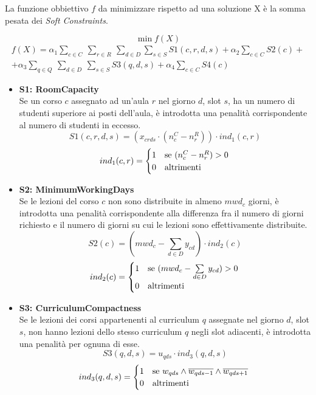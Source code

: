 \documentclass[]{article}
\begin{document}
La funzione obbiettivo $f$ da minimizzare rispetto ad una soluzione X è la somma pesata dei \textit{Soft Constraints}.

\[ \min f(X) \]
\vspace{6pt}
\[ 
\begin{split}
f(X) =  \alpha_1 \sum_{c \in C} \: \sum_{r \in R} \: \sum_{d \in D} \sum_{s \in S}  S1(c,r,d,s) +  \alpha_2 \sum_{c \in C} S2(c) + \\
+ \alpha_3 \sum_{q \in Q} \: \sum_{d \in D} \: \sum_{s \in S}S3(q,d,s) + \alpha_4 \sum_{c \in C}S4(c)
\end{split}
\]

\begin{itemize}
	\item \textbf{S1: RoomCapacity} \mbox{}\\
	
Se un corso $c$ assegnato ad un'aula $r$ nel giorno $d$, slot $s$, ha un numero di studenti superiore ai posti dell'aula, è introdotta una penalità corrispondente al numero di studenti in eccesso.
	\[ S1(c,r,d,s) = (x_{crds} \cdot (n_c^C - n_r^R)) \cdot ind_1(c,r)  \]
	\[ 
	ind_1(c,r) = 
	    \begin{cases}
			1 & \text{se $(n_c^C  - n_r^R) > 0$}\\
			0 & \text{altrimenti}
		\end{cases}\\
	\]
\end{itemize}


\begin{itemize}
	\item \textbf{S2: MinimumWorkingDays} \mbox{}\\
	
Se le lezioni del corso $c$ non sono distribuite in almeno $mwd_c$ giorni, è introdotta una penalità corrispondente alla differenza fra il numero di giorni richiesto e il numero di giorni su cui le lezioni sono effettivamente distribuite.
	\[ S2(c) = (mwd_c - \sum_{d \in D} y_{cd}) \cdot ind_2(c)  \]
	\[ 
		ind_2(c) = 
		\begin{cases}
			1 & \text{se ($mwd_c - \sum\limits_{d \in D} y_{cd}) > 0$}\\
			0 & \text{altrimenti}
		\end{cases}\\
	\]
\end{itemize}

\begin{itemize}
	\item \textbf{S3: CurriculumCompactness} \mbox{}\\	
	
Se le lezioni dei corsi appartenenti al curriculum $q$ assegnate nel giorno $d$, slot $s$,  non hanno lezioni dello stesso curriculum $q$ negli slot adiacenti, è introdotta una penalità per ognuna di esse.
	\[ S3(q,d,s) =  u_{qds} \cdot ind_3(q,d,s)  \]
	\[ 
		ind_3(q,d,s) = 
		\begin{cases}
			1 & \text{se $w_{qds}  \land \overline{w_{qds-1}} \land \overline{w_{qds+1}} $} \\
			0 & \text{altrimenti}
		\end{cases}\\
		\]
\end{itemize}
\end{document}
